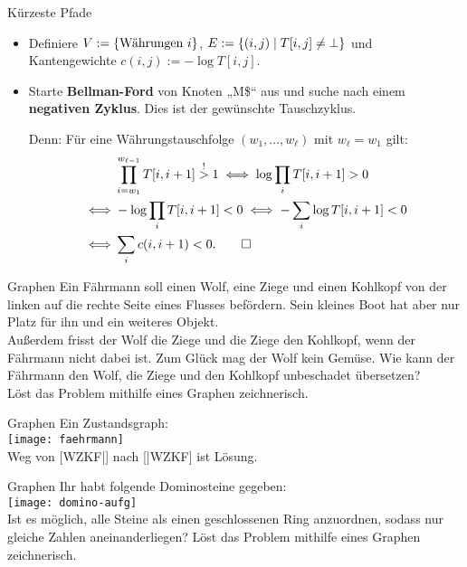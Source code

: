 \begin{frame}{Kürzeste Pfade}
	\solutionheading
	\begin{itemize}
		\item Definiere $V := \left\{\text{Währungen $i$}\right\}$, $E := \left\{(i, j) \;\middle|\; T[i,j] \neq \bot\right\}$ und Kantengewichte $c(i, j) := -\log T[i,j]$. 
		\pause
		\item Starte \textbf{Bellman-Ford} von Knoten „M\$“ aus und suche nach einem \textbf{negativen Zyklus}. Dies ist der gewünschte Tauschzyklus.
		\pause
		\item [Denn:\!] Für eine Währungstauschfolge $(w_1, ..., w_\ell)$ mit $w_\ell = w_1$ gilt: 
		\begin{align*}
			& \prod_{i = w_1}^{w_{\ell-1}} T[i, i+1] \stackrel{!}{>} 1 \Gdw \log \prod_i T[i, i+1] > 0 \\ 
			{\Gdw} &-\log \prod_i T[i, i+1] < 0 \Gdw -\sum_i \log T[i, i+1] < 0 \\
			{\Gdw} &\sum_i c(i, i+1) < 0. \qed
		\end{align*}
	\end{itemize}
\end{frame}

\begin{frame}{Graphen}
	Ein Fährmann soll einen Wolf, eine Ziege und einen Kohlkopf von der linken auf die rechte Seite eines Flusses befördern. Sein kleines Boot hat aber nur Platz für ihn und ein weiteres Objekt. \\
	Außerdem frisst der Wolf die Ziege und die Ziege den Kohlkopf, wenn der Fährmann nicht dabei ist. Zum Glück mag der Wolf kein Gemüse. Wie kann der Fährmann den Wolf, die Ziege und den Kohlkopf unbeschadet übersetzen? \\
	Löst das Problem mithilfe eines Graphen zeichnerisch.
\end{frame}

\begin{frame}{Graphen}
	\solutionheading
	Ein Zustandsgraph: \\
	\texttt{[image: faehrmann]} \\
	Weg von [WZKF|] nach [|WZKF] ist Lösung.
\end{frame}

\begin{frame}{Graphen}
	Ihr habt folgende Dominosteine gegeben: \\
	\texttt{[image: domino-aufg]} \\
	Ist es möglich, alle Steine als einen geschlossenen Ring anzuordnen, sodass nur gleiche Zahlen aneinanderliegen? Löst das Problem mithilfe eines Graphen zeichnerisch.
\end{frame}

